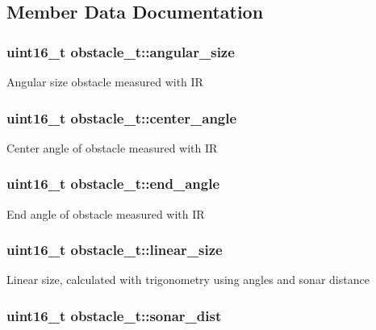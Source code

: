 \subsection{Member Data Documentation}
\hypertarget{structobstacle__t_a80604dbaad2331fe2ae468b4cd2cbf6d}{
\subsubsection[{angular\+\_\+size}]{\setlength{\rightskip}{0pt plus 5cm}uint16\+\_\+t obstacle\+\_\+t\+::angular\+\_\+size}}\label{structobstacle__t_a80604dbaad2331fe2ae468b4cd2cbf6d}
Angular size obstacle measured with I\+R \hypertarget{structobstacle__t_a79faa1d6029c85e932cc56ad126140a9}{
\subsubsection[{center\+\_\+angle}]{\setlength{\rightskip}{0pt plus 5cm}uint16\+\_\+t obstacle\+\_\+t\+::center\+\_\+angle}}\label{structobstacle__t_a79faa1d6029c85e932cc56ad126140a9}
Center angle of obstacle measured with I\+R \hypertarget{structobstacle__t_aede591174b61de4068016ba0aba626f0}{
\subsubsection[{end\+\_\+angle}]{\setlength{\rightskip}{0pt plus 5cm}uint16\+\_\+t obstacle\+\_\+t\+::end\+\_\+angle}}\label{structobstacle__t_aede591174b61de4068016ba0aba626f0}
End angle of obstacle measured with I\+R \hypertarget{structobstacle__t_a67b8df7b656893f775a7aa7cc2ffcc8a}{
\subsubsection[{linear\+\_\+size}]{\setlength{\rightskip}{0pt plus 5cm}uint16\+\_\+t obstacle\+\_\+t\+::linear\+\_\+size}}\label{structobstacle__t_a67b8df7b656893f775a7aa7cc2ffcc8a}
Linear size, calculated with trigonometry using angles and sonar distance \hypertarget{structobstacle__t_a196c79b0e4c77879208400f31d69e33d}{
\subsubsection[{sonar\+\_\+dist}]{\setlength{\rightskip}{0pt plus 5cm}uint16\+\_\+t obstacle\+\_\+t\+::sonar\+\_\+dist}}\label{structobstacle__t_a196c79b0e4c77879208400f31d69e33d}

